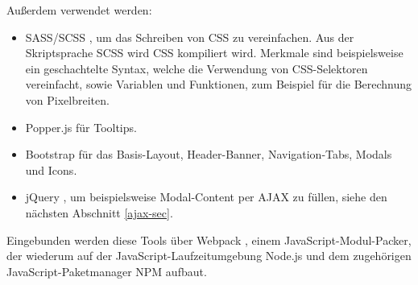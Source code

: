 Außerdem verwendet werden:

\begin{itemize}
\item SASS/SCSS \cite{sass}, um das Schreiben von CSS zu vereinfachen. Aus der Skriptsprache SCSS wird CSS kompiliert wird. Merkmale sind beispielsweise ein geschachtelte Syntax, welche die Verwendung von CSS-Selektoren vereinfacht, sowie Variablen und Funktionen, zum Beispiel für die Berechnung von Pixelbreiten. 
\item Popper.js \cite{popperjs} für Tooltips.
\item Bootstrap \cite{bootstrap} für das Basis-Layout, Header-Banner, Navigation-Tabs, Modals und Icons. 
\item jQuery \cite{jquery}, um beispielsweise Modal-Content per AJAX zu füllen, siehe den nächsten Abschnitt \ref{ajax-sec}.
\end{itemize}

Eingebunden werden diese Tools über Webpack \cite{webpack}, einem JavaScript-Modul-Packer, der wiederum auf der JavaScript-Laufzeitumgebung Node.js \cite{nodejs} und dem zugehörigen JavaScript-Paketmanager NPM \cite{npm} aufbaut. 

